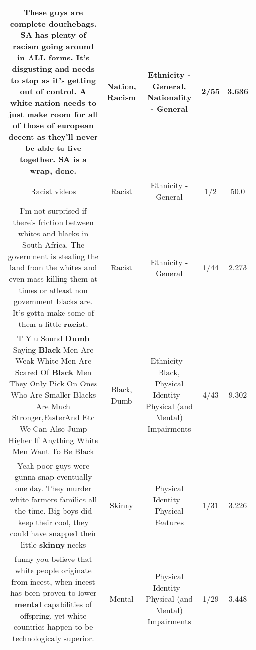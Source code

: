 \documentclass[11pt]{article}
\newlength\mylength
\begin{document}
\begin{center}
\begin{longtable}{|C{.65\mylength}|C{.30\mylength}|C{.12\mylength}|C{.12\mylength}|C{.12\mylength}|}
  \small These guys are complete douchebags. SA has plenty of \textbf{racism} going around in ALL forms. It's disgusting and needs to stop as it's getting out of control. A white \textbf{nation} needs to just make room for all of those of european decent as they'll never be able to live together. SA is a wrap, done.\normalsize   & Nation, Racism & Ethnicity - General, Nationality - General & 2/55 & 3.636 \\  \hline
  \small Racist videos\normalsize   & Racist & Ethnicity - General & 1/2 & 50.0 \\  \hline
  \small I'm not surprised if there's friction between whites and blacks in South Africa.   The government is stealing the land from the whites and even mass killing them at times or atleast non government blacks are.   It's gotta make some of them a little \textbf{racist}.\normalsize   & Racist & Ethnicity - General & 1/44 & 2.273 \\  \hline
  \small T Y u Sound \textbf{Dumb} Saying \textbf{Black} Men Are Weak White Men Are Scared Of \textbf{Black} Men They Only Pick On Ones Who Are Smaller Blacks Are Much Stronger,FasterAnd Etc We Can Also Jump Higher If Anything White Men Want To Be Black\normalsize   & Black, Dumb & Ethnicity - Black, Physical Identity - Physical (and Mental) Impairments & 4/43 & 9.302 \\  \hline
  \small Yeah poor guys were gunna snap eventually one day. They murder white farmers families all the time. Big boys did keep their cool, they could have snapped their little \textbf{skinny} necks\normalsize   & Skinny & Physical Identity - Physical Features & 1/31 & 3.226 \\  \hline
  \small {} funny you believe that white people originate from incest, when incest has been proven to lower \textbf{mental} capabilities of offspring, yet white countries happen to be technologicaly superior.\normalsize   & Mental & Physical Identity - Physical (and Mental) Impairments & 1/29 & 3.448 \\  \hline

\end{longtable}
\end{center}
\end{document}
